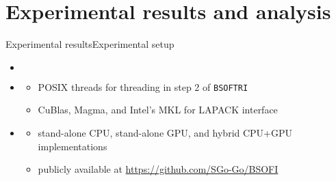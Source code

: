 \documentclass[xcolor=table,final]{beamer} %
\newcommand{\Bsoftri}{\texttt{BSOFTRI}\xspace}
\begin{document}
\section{Experimental results and analysis}

\begin{frame}{Experimental results}{Experimental setup}
  \renewcommand*\DTstyle{\sffamily\small}
  \renewcommand*\DTstylecomment{\footnotesize\textsl}
  \DTsetlength{0.2em}{1em}{0.2em}{0.4pt}{0.4pt}
  \begin{itemize}
  \item {}
    \begin{columns}
      \begin{column}{.5\textwidth}
      \end{column}
      \begin{column}{.5\textwidth}
      \end{column}
    \end{columns}

  \item {}
    \begin{itemize}
    \item POSIX threads for threading in step 2 of \Bsoftri
    \item CuBlas, Magma, and Intel's MKL for LAPACK interface
    \end{itemize}
    
  \item {}
    \begin{itemize}
    \item stand-alone CPU, stand-alone GPU, and hybrid CPU+GPU implementations
    \item publicly available at
      \url{https://github.com/SGo-Go/BSOFI}
    \end{itemize}
  \end{itemize}
\end{frame}
\end{document}
